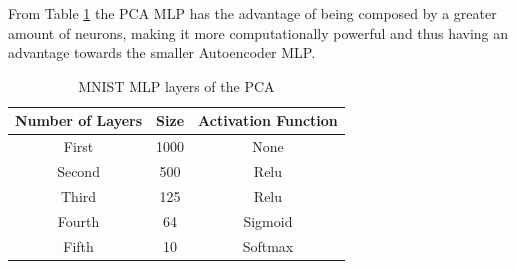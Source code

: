 From Table \ref{tab:table_MNIST_MLP_pca} the PCA MLP has the advantage of being composed by a greater amount of neurons, making it more computationally powerful and thus having an advantage towards the smaller Autoencoder MLP. 
%
\begin{table}[H]
	\caption{MNIST MLP layers of the PCA}
		\label{tab:table_MNIST_MLP_pca}
	\begin{center}
		\begin{tabular}{c|c|c} %
			\textbf{Number of Layers} & \textbf{Size} & \textbf{Activation Function} \\
			\hline
			First & 1000 & None\\
			Second & 500 & Relu\\
			Third & 125  & Relu\\
			Fourth & 64 & Sigmoid\\
			Fifth & 10 & Softmax \\
		\end{tabular}
	\end{center}
\end{table}



